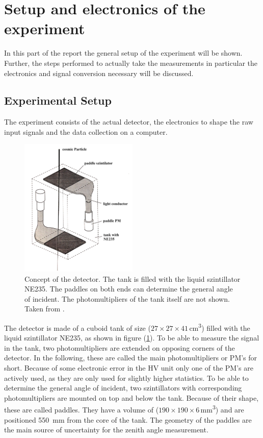 \section{Setup and electronics of the experiment} \label{sec:aufbau}

In this part of the report the general setup of the experiment will be shown.
Further, the steps performed to actually take the measurements in particular the electronics and signal conversion necessary will be discussed.

\subsection{Experimental Setup}

	The experiment consists of the actual detector, the electronics to shape the raw input signals and the data collection on a computer.

	\begin{figure}[ht]
		\centering
		\includegraphics[width=0.5\textwidth]{img/aufbau.jpg}
		\caption{Concept of the detector. 
			The tank is filled with the liquid szintillator NE235.
			The paddles on both ends can determine the general angle of incident.
			The photomultipliers of the tank itself are not shown.
			Taken from \cite{wwu}.}
		\label{fig:detector}
	\end{figure}
	
	The detector is made of a cuboid tank of size ($27 \times 27 \times 41$\,\si{\centi\meter\cubed}) filled with the liquid szintillator NE235, as shown in figure (\ref{fig:detector}).
	To be able to measure the signal in the tank, two photomultipliers are extended on opposing corners of the detector.
	In the following, these are called the main photomultipliers or PM's for short.
	Because of some electronic error in the HV unit only one of the PM's are actively used, as they are only used for slightly higher statistics.
	To be able to determine the general angle of incident, two szintillators with corresponding photomultipliers are mounted on top and below the tank.
	Because of their shape, these are called paddles.
	They have a volume of ($190 \times 190 \times 6$\,\si{\milli\meter\cubed}) and are positioned \SI{550}{\milli\meter} from the core of the tank.
	The geometry of the paddles are the main source of uncertainty for the zenith angle measurement.
	
